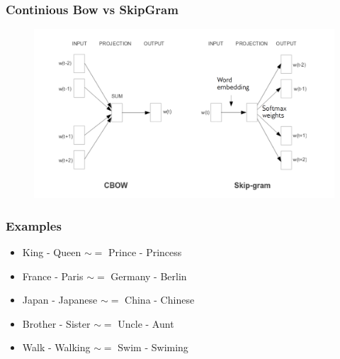 \documentclass[compress, aspectratio=54]{beamer}
\begin{document}
\begin{frame}
\frametitle{Continious Bow vs SkipGram}
\begin{figure}
\includegraphics[width=1.1\linewidth ]{Figures/cbow-skipgram}
\end{figure}

\end{frame}

\begin{frame}
\frametitle{Examples}
\begin{itemize}
\item King - Queen $\sim =$ Prince - Princess
\item France - Paris $\sim =$  Germany - Berlin
\item Japan - Japanese $\sim =$  China - Chinese
\item Brother - Sister $\sim = $ Uncle - Aunt
\item Walk - Walking $\sim =$  Swim - Swiming
\end{itemize}

\end{frame}
\end{document}
